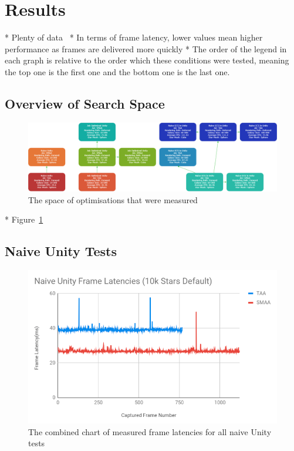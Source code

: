 \section{Results}
* Plenty of data~\cite{projectSpreadsheet}
* In terms of frame latency, lower values mean higher performance as frames are delivered more quickly
* The order of the legend in each graph is relative to the order which these conditions were tested, meaning the top one is the first one and the bottom one is the last one. 

\subsection{Overview of Search Space}
\begin{figure}[tbph]
    \centering
    \includegraphics[width=1\textwidth]{Figures/SearchSpace.png}
    \caption[Optimisation Search Space And Combinations]{The space of optimisations that were measured}
    \label{fig:searchspace}
\end{figure}

* Figure~\ref{fig:searchspace}

\subsection{Naive Unity Tests}
\begin{figure}[!p]
    \centering
    \includegraphics[width=1\textwidth]{Figures/naiveUnityLatencies.png}
    \caption[Combined Frame Latency Chart for Naive Unity Tests]{The combined chart of measured frame latencies for all naive Unity tests}
    \label{fig:naiveUnityLatency}
\end{figure}

